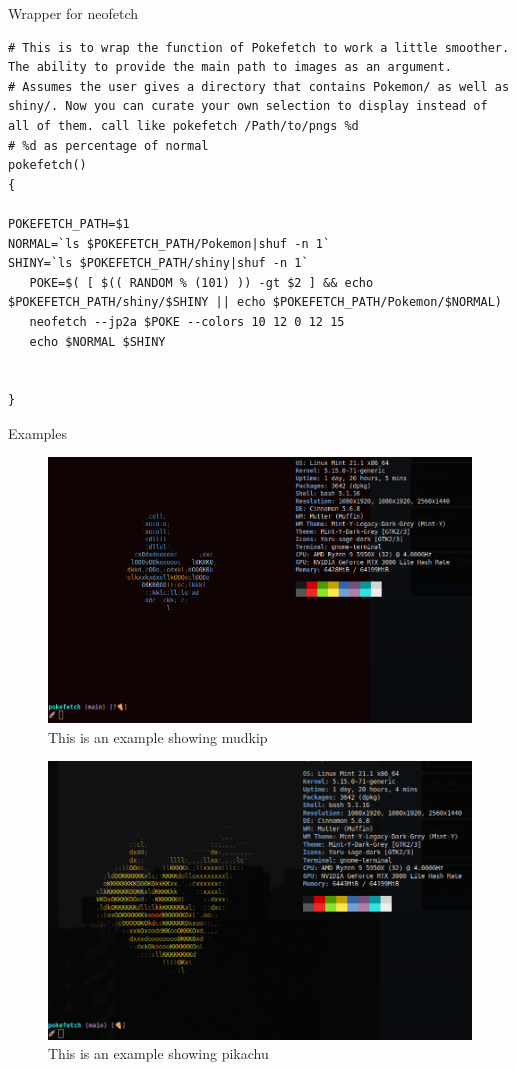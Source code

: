 \documentclass[presentation]{beamer}
\begin{document}
\begin{frame}[label={sec:orgf64b45a},fragile]{Wrapper for neofetch}
 \begin{verbatim}
# This is to wrap the function of Pokefetch to work a little smoother. The ability to provide the main path to images as an argument.
# Assumes the user gives a directory that contains Pokemon/ as well as shiny/. Now you can curate your own selection to display instead of all of them. call like pokefetch /Path/to/pngs %d
# %d as percentage of normal
pokefetch()
{

POKEFETCH_PATH=$1
NORMAL=`ls $POKEFETCH_PATH/Pokemon|shuf -n 1`
SHINY=`ls $POKEFETCH_PATH/shiny|shuf -n 1`
   POKE=$( [ $(( RANDOM % (101) )) -gt $2 ] && echo $POKEFETCH_PATH/shiny/$SHINY || echo $POKEFETCH_PATH/Pokemon/$NORMAL)
   neofetch --jp2a $POKE --colors 10 12 0 12 15
   echo $NORMAL $SHINY


}
\end{verbatim}
\end{frame}


\begin{frame}[label={sec:orgd6ba79f}]{Examples}
\begin{figure}[htbp]
\centering
\includegraphics[width=.9\linewidth]{./images/Mudkip_example.png}
\caption{\label{fig:org80579d8}This is an example showing mudkip}
\end{figure}

\begin{figure}[htbp]
\centering
\includegraphics[width=.9\linewidth]{./images/Pikachu_example.png}
\caption{\label{fig:org4eb2b00}This is an example showing pikachu}
\end{figure}
\end{frame}
\end{document}
